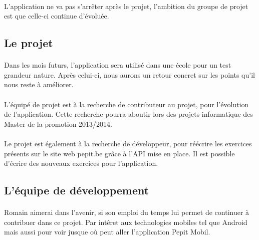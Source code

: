 \paragraph{}L'application ne va pas s'arrêter après le projet, l'ambition du groupe de projet est que celle-ci continue d'évoluée.

\subsection{Le projet}
\paragraph{}Dans les mois futurs, l'application sera utilisé dans une école pour un test grandeur nature. Après celui-ci, nous aurons un retour concret sur les points qu'il nous reste à améliorer.
\paragraph{}L'équipé de projet est à la recherche de contributeur au projet, pour l'évolution de l'application. Cette recherche pourra aboutir lors des projets informatique des Master de la promotion 2013/2014.
\paragraph{}Le projet est également à la recherche de développeur, pour réécrire les exercices présents sur le site web pepit.be gr\^{a}ce à l'API mise en place. Il est possible d'écrire des nouveaux exercices pour l'application.

\subsection{L'équipe de développement}
\paragraph{}Romain aimerai dans l'avenir, si son emploi du temps lui permet de continuer à contribuer dans ce projet. Par int\^{e}ret aux technologies mobiles tel que Android mais aussi pour voir jusque où peut aller l'application Pepit Mobil. 
